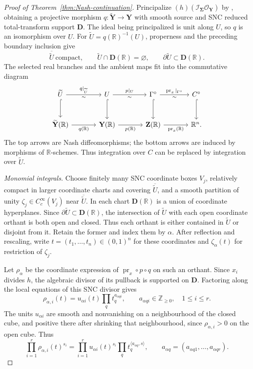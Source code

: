 \documentclass[a4paper,12pt]{amsart}
\numberwithin{equation}{section}
\theoremstyle{definition}
\theoremstyle{remark}
\newcommand{\R}{\mathbb R}
\newcommand{\pr}{\operatorname{pr}}
\begin{document}
\begin{proof}[Proof of Theorem~\ref{thm:Nash-continuation}]
Principalize $(h)(\mathcal I_{\boldsymbol\Sigma}\mathcal O_{\mathbf Y})$ by \cite[Theorem~35]{Kol07}, obtaining a projective morphism $q:\widetilde{\mathbf Y}\to\mathbf Y$ with smooth source and SNC reduced total-transform support $\mathbf D$. The ideal being principalized is unit along $U$, so $q$ is an isomorphism over $U$. For $\widetilde U=q(\R)^{-1}(U)$, properness and the preceding boundary inclusion give
\[
 \overline{\widetilde U}\ \text{compact},\qquad
 \widetilde U\cap\mathbf D(\R)=\varnothing,\qquad
 \partial\widetilde U\subset\mathbf D(\R).
\]
The selected real branches and the ambient maps fit into the commutative diagram
\[
\begin{tikzcd}[column sep=large,row sep=large]
 \widetilde U \arrow[r,"q|_{\widetilde U}","\sim"'] \arrow[d,hook]
 & U \arrow[r,"p|_U","\sim"'] \arrow[d,hook]
 & \Gamma^\circ \arrow[r,"\pr_x|_{\Gamma^\circ}","\sim"'] \arrow[d,hook]
 & C^\circ \arrow[d,hook] \\
 \widetilde{\mathbf Y}(\R) \arrow[r,"q(\R)"']
 & \mathbf Y(\R) \arrow[r,"p(\R)"']
 & \mathbf Z(\R) \arrow[r,"\pr_x(\R)"']
 & \R^n.
\end{tikzcd}
\]
The top arrows are Nash diffeomorphisms; the bottom arrows are induced by morphisms of $\R$-schemes. Thus integration over $C$ can be replaced by integration over $\widetilde U$.

\emph{Monomial integrals.}
Choose finitely many SNC coordinate boxes $V_j$, relatively compact in larger coordinate charts and covering $\overline{\widetilde U}$, and a smooth partition of unity $\zeta_j\in C_c^\infty(V_j)$ near $\overline{\widetilde U}$. In each chart $\mathbf D(\R)$ is a union of coordinate hyperplanes. Since $\partial\widetilde U\subset\mathbf D(\R)$, the intersection of $\widetilde U$ with each open coordinate orthant is both open and closed. Thus each orthant is either contained in $\widetilde U$ or disjoint from it. Retain the former and index them by $\alpha$. After reflection and rescaling, write $t=(t_1,\ldots,t_n)\in(0,1)^n$ for these coordinates and $\zeta_\alpha(t)$ for restriction of $\zeta_j$.

Let $\rho_\alpha$ be the coordinate expression of $\pr_x\circ p\circ q$ on such an orthant. Since $x_i$ divides $h$, the algebraic divisor of its pullback is supported on $\mathbf D$. Factoring along the local equations of this SNC divisor gives
\begin{equation}\label{eq:monomial-forms}
 \rho_{\alpha,i}(t)=u_{\alpha i}(t)\prod_qt_q^{a_{\alpha qi}},
 \qquad a_{\alpha qi}\in\mathbb Z_{\ge0},\quad 1\le i\le r.
\end{equation}
The units $u_{\alpha i}$ are smooth and nonvanishing on a neighbourhood of the closed cube, and positive there after shrinking that neighbourhood, since $\rho_{\alpha,i}>0$ on the open cube. Thus
\[
 \prod_{i=1}^r\rho_{\alpha,i}(t)^{s_i}
 =\prod_{i=1}^r u_{\alpha i}(t)^{s_i}
   \prod_qt_q^{\langle a_{\alpha q},s\rangle},
 \qquad a_{\alpha q}=(a_{\alpha q1},\ldots,a_{\alpha qr}).
\]


\end{proof}
\end{document}
